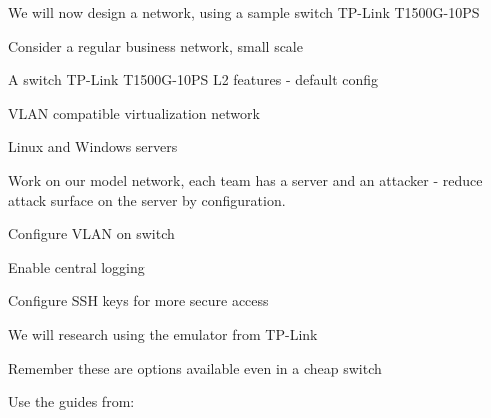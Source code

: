 \documentclass[Screen16to9,17pt]{foils}
\begin{document}

We will now design a network, using a sample switch TP-Link T1500G-10PS

\begin{list1}
\item Consider a regular business network, small scale
\end{list1}
\begin{list2}
\item A switch TP-Link T1500G-10PS L2 features - default config
\item VLAN compatible virtualization network
\item Linux and Windows servers
\end{list2}



\begin{list1}
\item Work on our model network, each team has a server and an attacker - reduce attack surface on the server by configuration.
\begin{list2}
\item Configure VLAN on switch 
\item Enable central logging
\item Configure SSH keys for more secure access
\end{list2}
\item We will research using the emulator from TP-Link
\item {}
\item Remember these are options available even in a cheap switch
\end{list1}

Use the guides from:\\
{\small {}}





\slidenext
\end{document}

